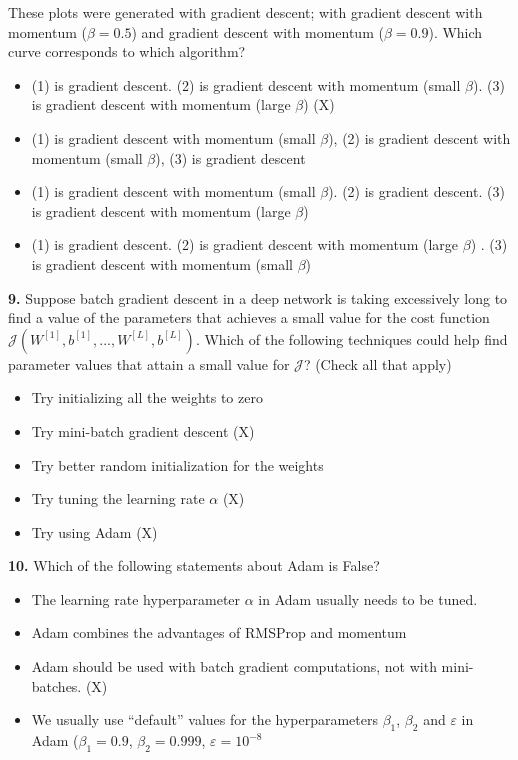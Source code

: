 These plots were generated with gradient descent; with gradient descent with momentum ($\beta = 0.5$) and gradient descent with momentum ($\beta = 0.9$). Which curve corresponds to which algorithm?
\begin{itemize}
    \item (1) is gradient descent. (2) is gradient descent with momentum (small $\beta$). (3) is gradient descent with momentum (large $\beta$) (X)
    \item (1) is gradient descent with momentum (small $\beta$), (2) is gradient descent with momentum (small $\beta$), (3) is gradient descent
    \item (1) is gradient descent with momentum (small $\beta$). (2) is gradient descent. (3) is gradient descent with momentum (large $\beta$)
    \item (1) is gradient descent. (2) is gradient descent with momentum (large $\beta$) . (3) is gradient descent with momentum (small $\beta$)
\end{itemize}
\textbf{9.} Suppose batch gradient descent in a deep network is taking excessively long to find a value of the parameters that achieves a small value for the cost function  $\mathcal{J}(W^{[1]},b^{[1]},..., W^{[L]},b^{[L]})$. Which of the following techniques could help find parameter values that attain a small value for $\mathcal{J}$? (Check all that apply)
\begin{itemize}
    \item Try initializing all the weights to zero
    \item Try mini-batch gradient descent (X)
    \item Try better random initialization for the weights
    \item Try tuning the learning rate $\alpha$ (X)
    \item Try using Adam (X)
\end{itemize}
\textbf{10.} Which of the following statements about Adam is False?
\begin{itemize}
    \item The learning rate hyperparameter $\alpha$ in Adam usually needs to be tuned.
    \item Adam combines the advantages of RMSProp and momentum
    \item Adam should be used with batch gradient computations, not with mini-batches. (X)
    \item We usually use “default” values for the hyperparameters $\beta_1$, $\beta_2$ and $\varepsilon$ in Adam ($\beta_1 = 0.9$, $\beta_2 = 0.999$, $\varepsilon = 10^{-8}$
\end{itemize}